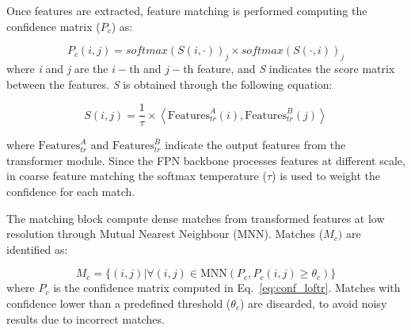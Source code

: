 \documentclass[sn-basic]{sn-jnl}%
\begin{document}



Once features are extracted, feature matching is performed computing the confidence matrix ($\mathit{P_c}$) as:

\begin{equation} \label{eq:conf_loftr}
P_c(i,j) = \textit{softmax}(S (i, \cdot))_j \times \textit{softmax}(S (\cdot, i))_j
\end{equation}
\noindent where \textit{i} and \textit{j} are the $i-\text{th}$ and $j-\text{th}$ feature, and \textit{S} indicates the score matrix between the features. \textit{S} is obtained through the following equation:

\begin{equation} \label{S_loftr}
S(i,j) = \frac{1}{\tau} \times \left\langle \textrm{Features}_{tr}^{A}(i),  \textrm{Features}_{tr}^{B}(j)\right\rangle
\end{equation}

\noindent where $\textrm{Features}_{tr}^{A}$ and $\textrm{Features}_{tr}^{B}$ indicate the output features from the transformer module. Since the FPN backbone processes features at different scale, in coarse feature matching the softmax temperature ($\tau$) is used to weight the confidence for each match.

The matching block compute dense matches from transformed features at low resolution through Mutual Nearest Neighbour (MNN). Matches ($M_{c})$ are identified as:

\begin{equation}
    M_{c} = \{ (i,j) \rvert \forall (i,j) \in \textrm{MNN}(P_{c}, P_{c}(i,j) \ge \theta_{c})\}
\label{eq:matches_loftr}
\end{equation}
\noindent where $\mathit{P_c}$ is the confidence matrix computed in Eq.~\ref{eq:conf_loftr}. Matches with confidence lower than a predefined threshold ($\mathit{\theta_{c}}$) are discarded, to avoid noisy results due to incorrect matches.
\end{document}
